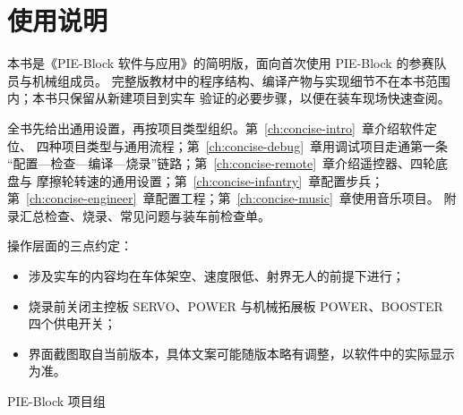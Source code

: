 \chapter*{使用说明}

本书是《PIE-Block 软件与应用》的简明版，面向首次使用 PIE-Block 的参赛队员与机械组成员。
完整版教材中的程序结构、编译产物与实现细节不在本书范围内；本书只保留从新建项目到实车
验证的必要步骤，以便在装车现场快速查阅。

全书先给出通用设置，再按项目类型组织。第~\ref{ch:concise-intro}~章介绍软件定位、
四种项目类型与通用流程；第~\ref{ch:concise-debug}~章用调试项目走通第一条
“配置—检查—编译—烧录”链路；第~\ref{ch:concise-remote}~章介绍遥控器、四轮底盘与
摩擦轮转速的通用设置；第~\ref{ch:concise-infantry}~章配置步兵；
第~\ref{ch:concise-engineer}~章配置工程；第~\ref{ch:concise-music}~章使用音乐项目。
附录汇总检查、烧录、常见问题与装车前检查单。

操作层面的三点约定：

\begin{itemize}
  \item 涉及实车的内容均在车体架空、速度限低、射界无人的前提下进行；
  \item 烧录前关闭主控板 SERVO、POWER 与机械拓展板 POWER、BOOSTER 四个供电开关；
  \item 界面截图取自当前版本，具体文案可能随版本略有调整，以软件中的实际显示为准。
\end{itemize}

\noindent PIE-Block 项目组
